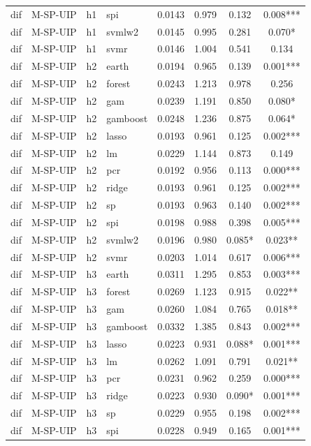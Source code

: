 \begin{ThreePartTable}
\begin{longtable}[t]{llclcccc}
dif & M-SP-UIP & h1 & spi & 0.0143 & 0.979 & 0.132 & 0.008***\\
dif & M-SP-UIP & h1 & svmlw2 & 0.0145 & 0.995 & 0.281 & 0.070*\\
dif & M-SP-UIP & h1 & svmr & 0.0146 & 1.004 & 0.541 & 0.134\\
\addlinespace
dif & M-SP-UIP & h2 & earth & 0.0194 & 0.965 & 0.139 & 0.001***\\
dif & M-SP-UIP & h2 & forest & 0.0243 & 1.213 & 0.978 & 0.256\\
dif & M-SP-UIP & h2 & gam & 0.0239 & 1.191 & 0.850 & 0.080*\\
dif & M-SP-UIP & h2 & gamboost & 0.0248 & 1.236 & 0.875 & 0.064*\\
dif & M-SP-UIP & h2 & lasso & 0.0193 & 0.961 & 0.125 & 0.002***\\
dif & M-SP-UIP & h2 & lm & 0.0229 & 1.144 & 0.873 & 0.149\\
dif & M-SP-UIP & h2 & pcr & 0.0192 & 0.956 & 0.113 & 0.000***\\
dif & M-SP-UIP & h2 & ridge & 0.0193 & 0.961 & 0.125 & 0.002***\\
dif & M-SP-UIP & h2 & sp & 0.0193 & 0.963 & 0.140 & 0.002***\\
dif & M-SP-UIP & h2 & spi & 0.0198 & 0.988 & 0.398 & 0.005***\\
dif & M-SP-UIP & h2 & svmlw2 & 0.0196 & 0.980 & 0.085* & 0.023**\\
dif & M-SP-UIP & h2 & svmr & 0.0203 & 1.014 & 0.617 & 0.006***\\
\addlinespace
dif & M-SP-UIP & h3 & earth & 0.0311 & 1.295 & 0.853 & 0.003***\\
dif & M-SP-UIP & h3 & forest & 0.0269 & 1.123 & 0.915 & 0.022**\\
dif & M-SP-UIP & h3 & gam & 0.0260 & 1.084 & 0.765 & 0.018**\\
dif & M-SP-UIP & h3 & gamboost & 0.0332 & 1.385 & 0.843 & 0.002***\\
dif & M-SP-UIP & h3 & lasso & 0.0223 & 0.931 & 0.088* & 0.001***\\
dif & M-SP-UIP & h3 & lm & 0.0262 & 1.091 & 0.791 & 0.021**\\
dif & M-SP-UIP & h3 & pcr & 0.0231 & 0.962 & 0.259 & 0.000***\\
dif & M-SP-UIP & h3 & ridge & 0.0223 & 0.930 & 0.090* & 0.001***\\
dif & M-SP-UIP & h3 & sp & 0.0229 & 0.955 & 0.198 & 0.002***\\
dif & M-SP-UIP & h3 & spi & 0.0228 & 0.949 & 0.165 & 0.001***\\

\end{longtable}
\end{ThreePartTable}
